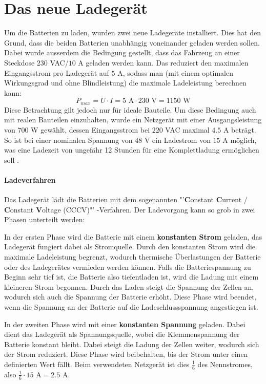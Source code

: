 \section{Das neue Ladegerät}
Um die Batterien zu laden, wurden zwei neue Ladegeräte installiert. Dies hat den Grund, dass die beiden Batterien unabhängig voneinander geladen werden sollen. Dabei wurde ausserdem die Bedingung gestellt, dass das Fahrzeug an einer Steckdose $230$ VAC/$10$ A geladen werden kann. Das reduziert den maximalen Eingangsstrom pro Ladegerät auf $5$ A, sodass man (mit einem optimalen Wirkungsgrad und ohne Blindleistung) die maximale Ladeleistung berechnen kann:
\begin{equation*}
	P_{max}=U\cdot I=5\text{ A}\cdot230\text{ V}=1150\text{ W}
\end{equation*}
Diese Betrachtung gilt jedoch nur für ideale Bauteile. Um diese Bedingung auch mit realen Bauteilen einzuhalten, wurde ein Netzgerät mit einer Ausgangsleistung von $700$ W gewählt, dessen Eingangsstrom bei $220$ VAC maximal $4.5$ A beträgt. So ist bei einer nominalen Spannung von $48$ V ein Ladestrom von $15$ A möglich, was eine Ladezeit von ungefähr 12 Stunden für eine Komplettladung ermöglichen soll \cite{ladegeraet}.

\paragraph{Ladeverfahren}
Das Ladegerät lädt die Batterien mit dem sogenannten "'\textbf{C}onstant \textbf{C}urrent / \textbf{C}onstant \textbf{V}oltage (CCCV)"' -Verfahren. Der Ladevorgang kann so grob in zwei Phasen unterteilt werden:

In der ersten Phase wird die Batterie mit einem \textbf{konstanten Strom} geladen, das Ladegerät fungiert dabei als Stromquelle. Durch den konstanten Strom wird die maximale Ladeleistung begrenzt, wodurch thermische Überlastungen der Batterie oder des Ladegerätes vermieden werden können. Falls die Batteriespannung zu Beginn sehr tief ist, die Batterie also tiefentladen ist, wird die Ladung mit einem kleineren Strom begonnen. Durch das Laden steigt die Spannung der Zellen an, wodurch sich auch die Spannung der Batterie erhöht. Diese Phase wird beendet, wenn die Spannung an der Batterie auf die Ladeschlussspannung angestiegen ist.

In der zweiten Phase wird mit einer \textbf{konstanten Spannung} geladen. Dabei dient das Ladegerät als Spannungsquelle, wobei die Klemmenspannung der Batterie konstant bleibt. Dabei steigt die Ladung der Zellen weiter, wodurch sich der Strom reduziert. Diese Phase wird beibehalten, bis der Strom unter einen definierten Wert fällt. Beim verwendeten Netzgerät ist dies $\frac{1}{6}$ des Nennstromes, also $\frac{1}{6}\cdot 15\text{ A}=2.5\text{ A}$.

